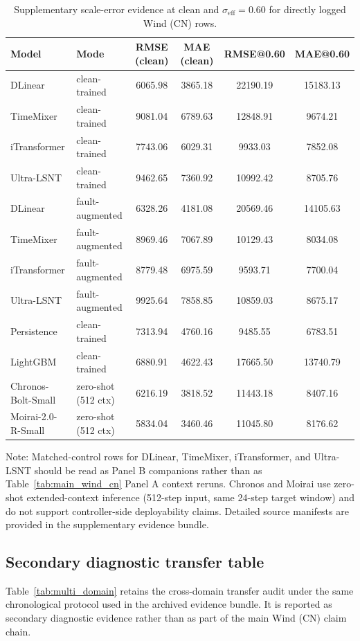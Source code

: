 ﻿\documentclass[review,1p,times]{elsarticle}
\newcommand{\aeTableNote}[1]{%
  \par\vspace{2pt}%
  \noindent\begin{minipage}{\linewidth}
    \raggedright\footnotesize
    Note: #1
  \end{minipage}%
  \par
}
\begin{document}
\begin{table}[t]
\centering
\caption{Supplementary scale-error evidence at clean and $\sigma_{\mathrm{eff}}=0.60$ for directly logged Wind (CN) rows.}
\label{tab:scale_error_audit}
\scriptsize
\setlength{\tabcolsep}{3.4pt}
\begin{tabular*}{\linewidth}{@{\extracolsep{\fill}}llcccc@{}}
\toprule
\textbf{Model} & \textbf{Mode} & \textbf{RMSE (clean)} & \textbf{MAE (clean)} & \textbf{RMSE@0.60} & \textbf{MAE@0.60} \\
\midrule
DLinear & clean-trained & 6065.98 & 3865.18 & 22190.19 & 15183.13 \\
TimeMixer & clean-trained & 9081.04 & 6789.63 & 12848.91 & 9674.21 \\
iTransformer & clean-trained & 7743.06 & 6029.31 & 9933.03 & 7852.08 \\
Ultra-LSNT & clean-trained & 9462.65 & 7360.92 & 10992.42 & 8705.76 \\
DLinear & fault-augmented & 6328.26 & 4181.08 & 20569.46 & 14105.63 \\
TimeMixer & fault-augmented & 8969.46 & 7067.89 & 10129.43 & 8034.08 \\
iTransformer & fault-augmented & 8779.48 & 6975.59 & 9593.71 & 7700.04 \\
Ultra-LSNT & fault-augmented & 9925.64 & 7858.85 & 10859.03 & 8675.17 \\
Persistence & clean-trained & 7313.94 & 4760.16 & 9485.55 & 6783.51 \\
LightGBM & clean-trained & 6880.91 & 4622.43 & 17665.50 & 13740.79 \\
Chronos-Bolt-Small & zero-shot (512 ctx) & 6216.19 & 3818.52 & 11443.18 & 8407.16 \\
Moirai-2.0-R-Small & zero-shot (512 ctx) & 5834.04 & 3460.46 & 11045.80 & 8176.62 \\
\bottomrule
\end{tabular*}
\aeTableNote{Matched-control rows for DLinear, TimeMixer, iTransformer, and Ultra-LSNT should be read as Panel B companions rather than as Table~\ref{tab:main_wind_cn} Panel A context reruns. Chronos and Moirai use zero-shot extended-context inference (512-step input, same 24-step target window) and do not support controller-side deployability claims. Detailed source manifests are provided in the supplementary evidence bundle.}
\end{table}

\subsection{Secondary diagnostic transfer table}
\label{subsec:transfer_secondary}
Table~\ref{tab:multi_domain} retains the cross-domain transfer audit under the same chronological protocol used in the archived evidence bundle. It is reported as secondary diagnostic evidence rather than as part of the main Wind (CN) claim chain.
\end{document}

